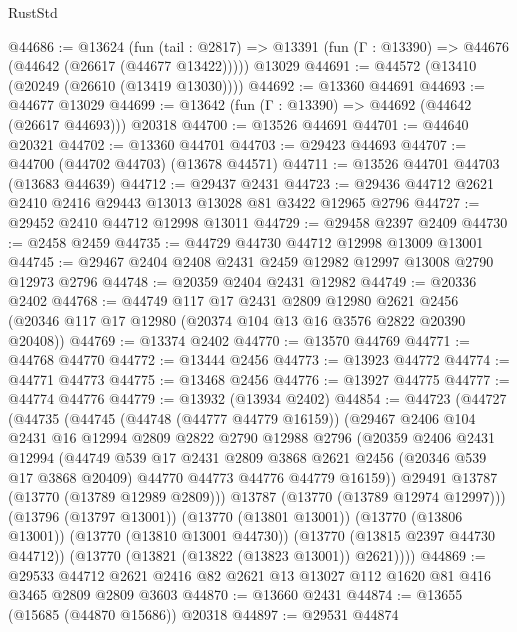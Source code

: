 \begin{lexlean}{RustStd}
\begin{coremodule}
@44686 := @13624
    (fun (tail : @2817) => @13391 (fun (Γ : @13390) => @44676 (@44642 (@26617 (@44677 @13422)))))
    @13029
@44691 := @44572 (@13410 (@20249 (@26610 (@13419 @13030))))
@44692 := @13360 @44691
@44693 := @44677 @13029
@44699 := @13642 (fun (Γ : @13390) => @44692 (@44642 (@26617 @44693))) @20318
@44700 := @13526 @44691
@44701 := @44640 @20321
@44702 := @13360 @44701
@44703 := @29423 @44693
@44707 := @44700 (@44702 @44703) (@13678 @44571)
@44711 := @13526 @44701 @44703 (@13683 @44639)
@44712 := @29437 @2431
@44723 := @29436 @44712 @2621 @2410 @2416 @29443 @13013 @13028 @81 @3422 @12965 @2796
@44727 := @29452 @2410 @44712 @12998 @13011
@44729 := @29458 @2397 @2409
@44730 := @2458 @2459
@44735 := @44729 @44730 @44712 @12998 @13009 @13001
@44745 := @29467 @2404 @2408 @2431 @2459 @12982 @12997 @13008 @2790 @12973 @2796
@44748 := @20359 @2404 @2431 @12982
@44749 := @20336 @2402
@44768 := @44749
    @117
    @17
    @2431
    @2809
    @12980
    @2621
    @2456
    (@20346 @117 @17 @12980 (@20374 @104 @13 @16 @3576 @2822 @20390 @20408))
@44769 := @13374 @2402
@44770 := @13570 @44769
@44771 := @44768 @44770
@44772 := @13444 @2456
@44773 := @13923 @44772
@44774 := @44771 @44773
@44775 := @13468 @2456
@44776 := @13927 @44775
@44777 := @44774 @44776
@44779 := @13932 (@13934 @2402)
@44854 := @44723
    (@44727
      (@44735
        (@44745
          (@44748 (@44777 @44779 @16159))
          (@29467
            @2406
            @104
            @2431
            @16
            @12994
            @2809
            @2822
            @2790
            @12988
            @2796
            (@20359
              @2406
              @2431
              @12994
              (@44749
                @539
                @17
                @2431
                @2809
                @3868
                @2621
                @2456
                (@20346 @539 @17 @3868 @20409)
                @44770
                @44773
                @44776
                @44779
                @16159))
            @29491
            @13787
            (@13770 (@13789 @12989 @2809)))
          @13787
          (@13770 (@13789 @12974 @12997)))
        (@13796 (@13797 @13001))
        (@13770 (@13801 @13001))
        (@13770 (@13806 @13001))
        (@13770 (@13810 @13001 @44730))
        (@13770 (@13815 @2397 @44730 @44712))
        (@13770 (@13821 (@13822 (@13823 @13001)) @2621))))
@44869 := @29533 @44712 @2621 @2416 @82 @2621 @13 @13027 @112 @1620 @81 @416 @3465 @2809 @2809 @3603
@44870 := @13660 @2431
@44874 := @13655 (@15685 (@44870 @15686)) @20318
@44897 := @29531
    @44874

\end{coremodule}
\end{lexlean}
